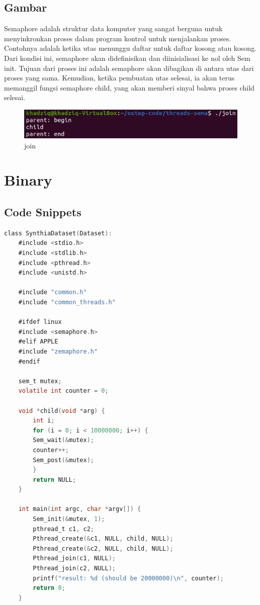 \documentclass[11pt,a4paper]{article}
\begin{document}
\subsection{Gambar}
    Semaphore adalah  struktur data komputer yang sangat berguna untuk menyinkronkan proses 
 dalam  program kontrol untuk menjalankan proses. Contohnya adalah ketika utas 
 menunggu daftar untuk daftar kosong atau  kosong. Dari kondisi ini, semaphore  
 akan didefinisikan dan diinisialisasi ke nol oleh Sem init. Tujuan dari proses ini adalah semaphore akan dibagikan di antara utas dari proses yang sama. Kemudian, ketika pembuatan utas selesai, ia akan terus memanggil fungsi  semaphore child, yang akan memberi sinyal bahwa proses child selesai.

    
\begin{figure}[h]
    \centering
    \includegraphics[scale = 0.9]{Figure/join.png}
    \caption{join}
    \label{fig:join}
\end{figure}
\section{Binary}
\subsection{Code Snippets}
    \begin{lstlisting}[language=C, caption=Captionnya tulis di sini class,label={labelkode}]
    class SynthiaDataset(Dataset):
    #include <stdio.h>
    #include <stdlib.h>
    #include <pthread.h>
    #include <unistd.h>

    #include "common.h"
    #include "common_threads.h"

    #ifdef linux
    #include <semaphore.h>
    #elif APPLE
    #include "zemaphore.h"
    #endif

    sem_t mutex;
    volatile int counter = 0;

    void *child(void *arg) {
        int i;
        for (i = 0; i < 10000000; i++) {
	    Sem_wait(&mutex);
	    counter++;
	    Sem_post(&mutex);
        }
        return NULL;
    }

    int main(int argc, char *argv[]) {
        Sem_init(&mutex, 1); 
        pthread_t c1, c2;
        Pthread_create(&c1, NULL, child, NULL);
        Pthread_create(&c2, NULL, child, NULL);
        Pthread_join(c1, NULL);
        Pthread_join(c2, NULL);
        printf("result: %d (should be 20000000)\n", counter);
        return 0;
    }
    \end{lstlisting}
\end{document}
